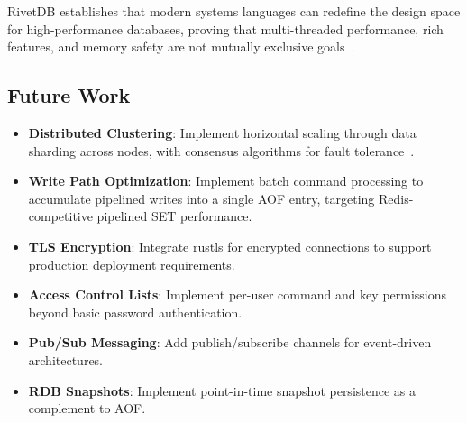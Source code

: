 \documentclass[conference,a4paper]{IEEEtran}
\begin{document}
RivetDB establishes that modern systems languages can redefine the design space for high-performance databases, proving that multi-threaded performance, rich features, and memory safety are not mutually exclusive goals~\cite{jung2021}.

\subsection{Future Work}

\begin{itemize}
    \item \textbf{Distributed Clustering}: Implement horizontal scaling through data sharding across nodes, with consensus algorithms for fault tolerance~\cite{bernstein1981}.
    \item \textbf{Write Path Optimization}: Implement batch command processing to accumulate pipelined writes into a single AOF entry, targeting Redis-competitive pipelined SET performance.
    \item \textbf{TLS Encryption}: Integrate rustls for encrypted connections to support production deployment requirements.
    \item \textbf{Access Control Lists}: Implement per-user command and key permissions beyond basic password authentication.
    \item \textbf{Pub/Sub Messaging}: Add publish/subscribe channels for event-driven architectures.
    \item \textbf{RDB Snapshots}: Implement point-in-time snapshot persistence as a complement to AOF.
\end{itemize}
\end{document}
